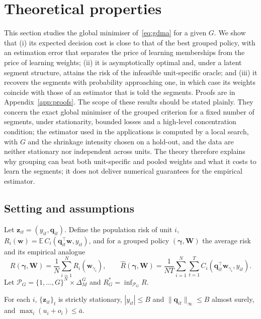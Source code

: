 \section{Theoretical properties}\label{sec:theory}

This section studies the global minimiser of~\eqref{eq:gdma} for a given $G$.
We show that (i) its expected decision cost is close to that of the best grouped policy, with an estimation error that separates the price of learning memberships from the price of learning weights; (ii) it is asymptotically optimal and, under a latent segment structure, attains the risk of the infeasible unit-specific oracle; and (iii) it recovers the segments with probability approaching one, in which case its weights coincide with those of an estimator that is told the segments.
Proofs are in Appendix~\ref{app:proofs}.
The scope of these results should be stated plainly.
They concern the exact global minimiser of the grouped criterion for a fixed number of segments, under stationarity, bounded losses and a high-level concentration condition; the estimator used in the applications is computed by a local search, with $G$ and the shrinkage intensity chosen on a hold-out, and the data are neither stationary nor independent across units.
The theory therefore explains why grouping can beat both unit-specific and pooled weights and what it costs to learn the segments; it does not deliver numerical guarantees for the empirical estimator.

\subsection{Setting and assumptions}

Let $\bm z_{it}=(y_{it},\bm q_{it})$.
Define the population risk of unit $i$, $R_i(\bm w)=\mathbb E\,C_i(\bm q_{it}^\top\bm w,y_{it})$, and for a grouped policy $(\bm\gamma,\bm W)$ the average risk and its empirical analogue
\[
R(\bm\gamma,\bm W)=\frac1N\sum_{i=1}^N R_i(\bm w_{\gamma_i}),\qquad
\widehat R(\bm\gamma,\bm W)=\frac1{NT}\sum_{i=1}^N\sum_{t=1}^T C_i(\bm q_{it}^\top\bm w_{\gamma_i},y_{it}).
\]
Let $\mathcal P_G=\{1,\dots,G\}^N\times\Delta_M^G$ and $R^*_G=\inf_{\mathcal P_G}R$.

\begin{assumption}\label{as:bounded}
For each $i$, $\{\bm z_{it}\}_t$ is strictly stationary, $|y_{it}|\le B$ and $\|\bm q_{it}\|_\infty\le B$ almost surely, and $\max_i(u_i+o_i)\le\bar a$.
\end{assumption}


